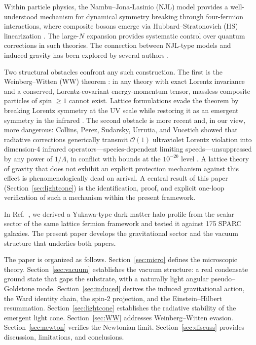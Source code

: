 \documentclass[11pt,a4paper]{article}
\begin{document}
Within particle physics, the Nambu--Jona-Lasinio (NJL) model
\cite{Nambu:1961tp,Nambu:1961fr} provides a well-understood
mechanism for dynamical symmetry breaking through four-fermion
interactions, where composite bosons emerge via
Hubbard--Stratonovich (HS) linearization
\cite{Hubbard:1959ub,Stratonovich:1957}.
The large-$N$ expansion \cite{tHooft:1973alw,Coleman:1985rnk}
provides systematic control over quantum corrections in such
theories.
The connection between NJL-type models and induced gravity
has been explored by several authors
\cite{Akama:1978pg,Zee:1981,Amati:1982bp}.

Two structural obstacles confront any such construction.
The first is the Weinberg--Witten (WW) theorem
\cite{Weinberg:1980kq}: in any theory with exact Lorentz invariance
and a conserved, Lorentz-covariant energy-momentum tensor, massless
composite particles of spin $\geq 1$ cannot exist.
Lattice formulations evade the theorem by breaking Lorentz symmetry
at the UV scale while restoring it as an emergent symmetry in the
infrared \cite{Volovik:2003fe,Barcelo:2005fc}.
The second obstacle is more recent and, in our view, more
dangerous: Collins, Perez, Sudarsky, Urrutia, and Vucetich
\cite{Collins:2004bp} showed that radiative corrections generically
transmit $\mathcal{O}(1)$ ultraviolet Lorentz violation into
dimension-4 infrared operators---species-dependent limiting
speeds---unsuppressed by any power of $1/\Lambda$, in conflict with
bounds at the $10^{-20}$ level \cite{Liberati:2013xla}.
A lattice theory of gravity that does not exhibit an explicit
protection mechanism against this effect is phenomenologically
dead on arrival.
A central result of this paper (Section~\ref{sec:lightcone}) is the
identification, proof, and explicit one-loop verification of such a
mechanism within the present framework.

In Ref.~\cite{Cheng:2025sparc}, we derived a Yukawa-type dark
matter halo profile from the scalar sector of the same lattice
fermion framework and tested it against 175 SPARC galaxies.
The present paper develops the gravitational sector and the vacuum
structure that underlies both papers.

The paper is organized as follows.
Section~\ref{sec:micro} defines the microscopic theory.
Section~\ref{sec:vacuum} establishes the vacuum structure: a real
condensate ground state that gaps the substrate, with a naturally
light angular pseudo--Goldstone mode.
Section~\ref{sec:induced} derives the induced gravitational action,
the Ward identity chain, the spin-2 projection, and the
Einstein--Hilbert resummation.
Section~\ref{sec:lightcone} establishes the radiative stability of
the emergent light cone.
Section~\ref{sec:WW} addresses Weinberg--Witten evasion.
Section~\ref{sec:newton} verifies the Newtonian limit.
Section~\ref{sec:discuss} provides discussion, limitations, and
conclusions.
\end{document}
